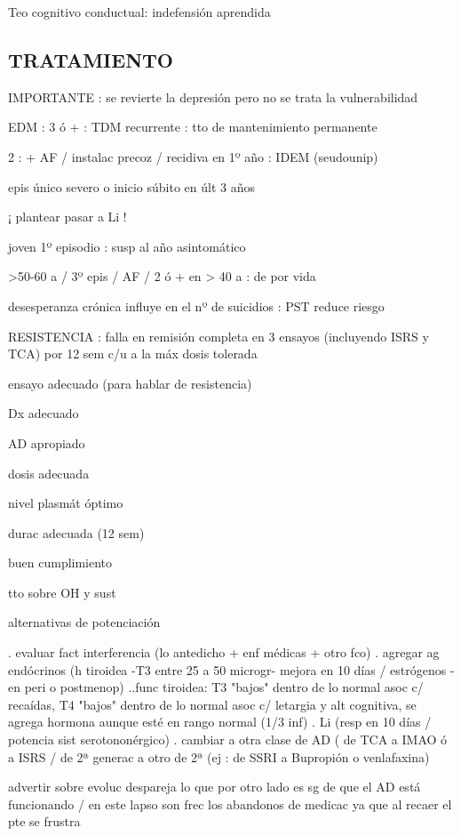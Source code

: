 Teo cognitivo conductual: indefensión aprendida

\subsection*{TRATAMIENTO}

IMPORTANTE : se revierte la depresión pero no se trata la vulnerabilidad

EDM : 3 ó + : TDM recurrente : tto de mantenimiento permanente

2 : + AF / instalac precoz / recidiva en 1º año : IDEM (seudounip)

epis único severo o inicio súbito en últ 3 años

¡ plantear pasar a Li !

joven 1º episodio : susp al año asintomático

>50-60 a / 3º epis / AF / 2 ó + en > 40 a : de por vida

desesperanza crónica influye en el nº de suicidios : PST reduce riesgo

RESISTENCIA : falla en remisión completa en 3 ensayos (incluyendo ISRS y TCA) por 12 sem c/u a la máx dosis tolerada

ensayo adecuado (para hablar de resistencia)

Dx adecuado

AD apropiado

dosis adecuada

nivel plasmát óptimo

durac adecuada (12 sem)

buen cumplimiento

tto sobre OH y sust

alternativas de potenciación

. evaluar fact interferencia (lo antedicho + enf médicas + otro fco)
. agregar ag endócrinos (h tiroidea -T3 entre 25 a 50 microgr- mejora en 10 días / estrógenos - en peri o postmenop)
..func tiroidea: T3 "bajos" dentro de lo normal asoc c/ recaídas, T4 "bajos" dentro de lo normal asoc c/ letargia y alt cognitiva, se agrega hormona aunque esté en rango normal (1/3 inf)
. Li (resp en 10 días / potencia sist serotononérgico)
. cambiar a otra clase de AD ( de TCA a IMAO ó a ISRS / de 2ª generac a otro de 2ª (ej : de SSRI a Bupropión o venlafaxina)

advertir sobre evoluc despareja lo que por otro lado es sg de que el AD está funcionando / en este lapso son frec los abandonos de medicac ya que al recaer el pte se frustra

